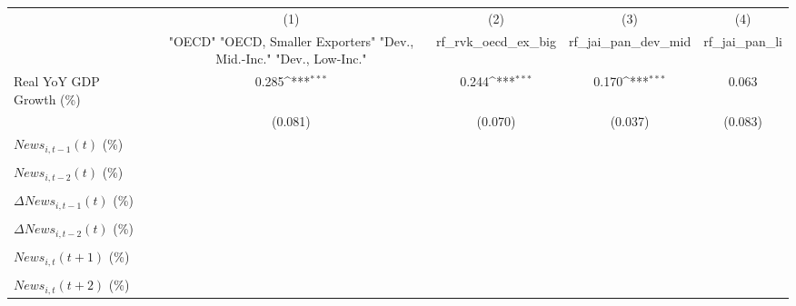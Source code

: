 {
\def\sym#1{\ifmmode^{#1}\else\(^{#1}\)\fi}
\begin{tabular}{l*{4}{c}}
\toprule
                    &\multicolumn{1}{c}{(1)}&\multicolumn{1}{c}{(2)}&\multicolumn{1}{c}{(3)}&\multicolumn{1}{c}{(4)}\\
                    &\multicolumn{1}{c}{ "OECD" "OECD, Smaller Exporters" "Dev., Mid.-Inc." "Dev., Low-Inc."}&\multicolumn{1}{c}{rf_rvk_oecd_ex_big}&\multicolumn{1}{c}{rf_jai_pan_dev_mid}&\multicolumn{1}{c}{rf_jai_pan_li}\\
\midrule
Real YoY GDP Growth (\%)&       0.285\sym{***}&       0.244\sym{***}&       0.170\sym{***}&       0.063         \\
                    &     (0.081)         &     (0.070)         &     (0.037)         &     (0.083)         \\
\addlinespace
$ News_{i,t-1}(t)$ (\%)&                     &                     &                     &                     \\
                    &                     &                     &                     &                     \\
\addlinespace
$ News_{i,t-2}(t)$ (\%)&                     &                     &                     &                     \\
                    &                     &                     &                     &                     \\
\addlinespace
$ \Delta News_{i,t-1}(t)$ (\%)&                     &                     &                     &                     \\
                    &                     &                     &                     &                     \\
\addlinespace
$ \Delta News_{i,t-2}(t)$ (\%)&                     &                     &                     &                     \\
                    &                     &                     &                     &                     \\
\addlinespace
$ News_{i,t}(t+1)$ (\%)&                     &                     &                     &                     \\
                    &                     &                     &                     &                     \\
\addlinespace
$ News_{i,t}(t+2)$ (\%)&                     &                     &                     &                     \\

\end{tabular}}
